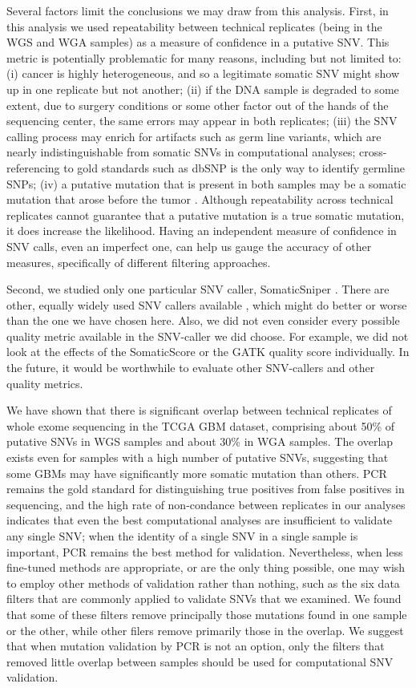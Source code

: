 \documentclass[11 pt]{article} %
\begin{document}
Several factors limit the conclusions we may draw from this analysis. First, in this analysis we used repeatability between technical replicates (being in the WGS and WGA samples) as a measure of confidence in a putative SNV. This metric is potentially problematic for many reasons, including but not limited to: (i) cancer is highly heterogeneous, and so a legitimate somatic SNV might show up in one replicate but not another; (ii) if the DNA sample is degraded to some extent, due to surgery conditions or some other factor out of the hands of the sequencing center, the same errors may appear in both replicates; (iii) the SNV calling process may enrich for artifacts such as germ line variants, which are nearly indistinguishable from somatic SNVs in computational analyses; cross-referencing to gold standards such as dbSNP is the only way to identify germline SNPs; (iv) a putative mutation that is present in both samples may be a somatic mutation that arose before the tumor \citep{pre-tumor-muts}. Although repeatability across technical replicates cannot guarantee that a putative mutation is a true somatic mutation, it does increase the likelihood. Having an independent measure of confidence in SNV calls, even an imperfect one, can help us gauge the accuracy of other measures, specifically of different filtering approaches. 

Second, we studied only one particular SNV caller, SomaticSniper \citep{SomaticSniper}. There are other, equally widely used SNV callers available \citep{MuTect, VarScan, Strelka}, which might do better or worse than the one we have chosen here. Also, we did not even consider every possible quality metric available in the SNV-caller we did choose. For example, we did not look at the effects of the SomaticScore or the GATK quality score individually. In the future, it would be worthwhile to evaluate other SNV-callers and other quality metrics.

We have shown that there is significant overlap between technical replicates of whole exome sequencing in the TCGA GBM dataset, comprising about 50\% of putative SNVs in WGS samples and about 30\% in WGA samples. The overlap exists even for samples with a high number of putative SNVs, suggesting that some GBMs may have significantly more somatic mutation than others. PCR remains the gold standard for distinguishing true positives from false positives in sequencing, and the high rate of non-condance between replicates in our analyses indicates that even the best computational analyses are insufficient to validate any single SNV; when the identity of a single SNV in a single sample is important, PCR remains the best method for validation. Nevertheless, when less fine-tuned methods are appropriate, or are the only thing possible, one may wish to employ other methods of validation rather than nothing, such as the six data filters that are commonly applied to validate SNVs that we examined. We found that some of these filters remove principally those mutations found in one sample or the other, while other filers remove primarily those in the overlap. We suggest that when mutation validation by PCR is not an option, only the filters that removed little overlap between samples should be used for computational SNV validation.
\end{document}
